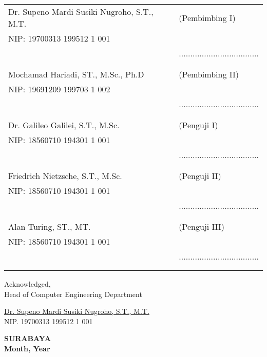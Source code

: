     \noindent
    \begin{tabularx}{\textwidth}{X l}
      Dr. Supeno Mardi Susiki Nugroho, S.T., M.T. & (Pembimbing I) \\
      NIP: 19700313 199512 1 001        & \\
      & ................................... \\
      &  \\
      &  \\
      Mochamad Hariadi, ST., M.Sc., Ph.D & (Pembimbing II) \\
      NIP: 19691209 199703 1 002        & \\
      & ................................... \\
      &  \\
      &  \\
      Dr. Galileo Galilei, S.T., M.Sc.  & (Penguji I) \\
      NIP: 18560710 194301 1 001        & \\
      & ................................... \\
      &  \\
      &  \\
      Friedrich Nietzsche, S.T., M.Sc.  & (Penguji II) \\
      NIP: 18560710 194301 1 001        & \\
      & ................................... \\
      &  \\
      &  \\
      Alan Turing, ST., MT.             & (Penguji III) \\
      NIP: 18560710 194301 1 001        & \\
      & ................................... \\
      &  \\
      &  \\
    \end{tabularx}
  \endgroup


  \begin{center}
    Acknowledged, \\
    Head of Computer Engineering Department\\

    \vspace{8ex}

    \underline{Dr. Supeno Mardi Susiki Nugroho, S.T., M.T.} \\
    NIP. 19700313 199512 1 001
  \end{center}

  \begin{center}
    \textbf{SURABAYA\\Month, Year}
  \end{center}
\endgroup
